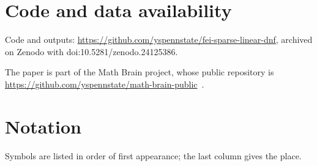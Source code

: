 \documentclass[11pt]{amsart}
\theoremstyle{remark}
\begin{document}
\section*{Code and data availability}
Code and outputs: \url{https://github.com/yspennstate/fei-sparse-linear-dnf}, archived on Zenodo with doi:10.5281/zenodo.24125386.

The paper is part of the Math Brain project, whose public repository is
\url{https://github.com/yspennstate/math-brain-public}~\cite{MathBrainRepo}.

\appendix
\section{Notation}\label{app:notation}

Symbols are listed in order of first appearance; the last column gives the place.
\end{document}
